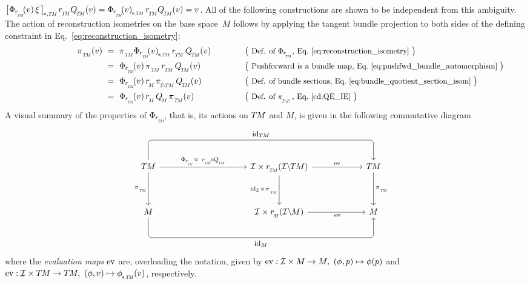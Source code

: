 $\big[ \Phir{v}\, \xi\, \big]_{\!*,\scalebox{.58}{$T\mkern-1.5muM$}}\mkern2mu \rTM\QTM(v) = \dPhirTM{v}\, \rTM\QTM(v) = v$.
All of the following constructions are shown to be independent from this ambiguity.
The action of reconstruction isometries on the base space~$M$ follows by applying the tangent bundle projection to both sides of the defining constraint in Eq.~\eqref{eq:reconstruction_isometry}:
\begin{alignat}{3}\label{eq:reconstruction_isometry_basespace}
    \qquad\qquad\qquad
    \piTM(v)
    \ &=\ \piTM \dPhirTM{v}\, \rTM\, \QTM(v)
        \qquad\quad && \big( \textup{\small Def. of $\PhirNoArg\,$, Eq.~\eqref{eq:reconstruction_isometry} } \big) \notag \\
    \ &=\ \Phir{v}\, \piTM\, \rTM\, \QTM(v)
        \qquad\quad && \big( \textup{\small Pushforward is a bundle map, Eq.~\eqref{eq:pushfwd_bundle_automorphism} } \big) \notag \\
    \ &=\ \Phir{v}\, \rM\, \piITM\, \QTM(v)
        \qquad\quad && \big( \textup{\small Def. of bundle sections, Eq.~\eqref{eq:bundle_quotient_section_isom} } \big) \notag \\
    \ &=\ \Phir{v}\, \rM\, \QM\,  \piTM(v)
        \qquad\quad && \big( \textup{\small Def. of $\piIE\,$, Eq.~\eqref{cd:QE_IE} } \big)
\end{alignat}
A visual summary of the properties of $\PhirNoArg$, that is, its actions on $T\mkern-1.5muM$ and $M$, is given in the following commutative diagram
\begin{equation}
    \begin{tikzcd}[row sep=3.5em, column sep=6em]
        \TM
            \arrow[d, "\piTM"']
            \arrow[r, "\PhirNoArg \,\times\ \rTM \mkern-2mu\circ\mkern-2mu \QTM"]
            \arrow[rr, rounded corners, to path={ 
                    -- ([yshift=+5.5ex]\tikztostart.north) 
                    --node[above, pos=.5]{\small$\id_{\TM}$} ([yshift=+5.5ex]\tikztotarget.north) 
                    -- (\tikztotarget.north)
                    }]
        &[10ex]
        \I \times \rTM(\ITM)
            \arrow[r, "\ev"]
            \arrow[d, "\id_{\I} \times \piTM"']
        & \TM
            \arrow[d, "\piTM"]
        \\
          M
            \arrow[rr, rounded corners, to path={ 
                    -- ([yshift=-5.5ex]\tikztostart.south) 
                    --node[below, pos=.5]{\small$\id_M$} ([yshift=-5.5ex]\tikztotarget.south) 
                    -- (\tikztotarget.south)
                    }]
        &[10ex] \I \times \rM(\IM)
            \arrow[r, pos=.52, "\ev"']
        & M
    \end{tikzcd}
    \quad
\end{equation}
where the \emph{evaluation maps} $\operatorname{ev}$ are, overloading the notation, given by $\operatorname{ev}: \mathcal{I}\times  M \to  M,\ (\phi,p) \mapsto \phi(p)$ and $\ev: \I\times \TM \to \TM,\ (\phi,v) \mapsto \dphiTM(v)$, respectively.




